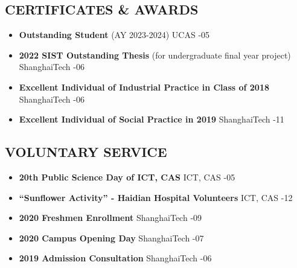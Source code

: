 \documentclass[a4paper,10pt]{ctexart} %
\begin{document}
\begin{keepsection}

\section{CERTIFICATES \& AWARDS}
\begin{itemize}
    \item \textbf{Outstanding Student} (AY 2023-2024) \hfill UCAS -05
    \item \textbf{2022 SIST Outstanding Thesis} (for undergraduate final year project) \hfill ShanghaiTech -06
    \item \textbf{Excellent Individual of Industrial Practice in Class of 2018} \hfill ShanghaiTech -06
    \item \textbf{Excellent Individual of Social Practice in 2019} \hfill ShanghaiTech -11
\end{itemize}

\end{keepsection}



\begin{keepsection}

\section{VOLUNTARY SERVICE}
\begin{itemize}
    \item \textbf{20th Public Science Day of ICT, CAS}  \hfill ICT, CAS -05
    \item \textbf{``Sunflower Activity'' - Haidian Hospital Volunteers}  \hfill ICT, CAS -12
    \item \textbf{2020 Freshmen Enrollment}  \hfill ShanghaiTech -09
    \item \textbf{2020 Campus Opening Day}  \hfill ShanghaiTech -07
    \item \textbf{2019 Admission Consultation}  \hfill ShanghaiTech -06
\end{itemize}

\end{keepsection}
\end{document}
